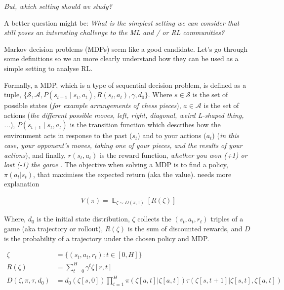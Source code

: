 \begin{displayquote}
  \textit{But, which setting should we study?}
\end{displayquote}

\begin{displayquote}
  A better question might be: \textit{What is the simplest setting we can
  consider that still poses an interesting challenge to the ML and / or RL communities?}
\end{displayquote}

Markov decision problems (MDPs) seem like a good candidate. Let's go through some definitions so we an more clearly understand how they can be used as a
simple setting to analyse RL.

Formally, a MDP, which is a type of sequential decision problem, is defined
as a tuple, $\{\mathcal S, \mathcal A, P(s_{t+1} \mid s_t, a_t),R(s_t, a_t), \gamma, d_0\}$.
Where \(s \in \mathcal S\) is the set of possible states (\textit{for example arrangements of chess pieces}),
\(a \in \mathcal A\) is the set of actions (\textit{the different possible moves, left,
right, diagonal, weird L-shaped thing, ...}),  \(P(s_{t+1} \mid s_t, a_t)\)
is the transition function which describes how the environment acts in response
to the past (\(s_t\)) and to your actions (\(a_t\)) (\textit{in this case, your
opponent's moves, taking one of your pieces, and the results of your actions}),
and finally, \(r(s_t, a_t)\) is the reward function, \textit{whether you won (+1) or lost (-1) the game }.
The objective when solving a MDP is to find a policy, $\pi(a_t | s_t)$,
that maximises the expected return (aka the value). {\color{red}needs more explanation}

\begin{align*}
V(\pi) = \mathop{\mathbb E}_{\zeta \sim D(\pi, \tau)} [R(\zeta)]
\end{align*}


Where, $d_0$ is the initial state distribution, $\zeta$ collects the $(s_t, a_t, r_t)$ triples of a game (aka trajectory or rollout),
$R(\zeta)$ is the sum of discounted rewards, and $D$ is the probability of a trajectory under the chosen policy and MDP.

\begin{align}
\zeta &= \{(s_t, a_t, r_t) : t \in [0, H]\} \tag{trajectory} \\
R(\zeta) &=\sum_{t=0}^H \gamma^t \zeta[r, t] \tag{Return} \\
D(\zeta, \pi, \tau, d_0) &= d_0(\zeta[s, 0]) \prod_{t=1}^{H} \pi(\zeta[a, t]|\zeta[a, t]) \tau(\zeta[s, t+1]|\zeta[s, t], \zeta[a, t]) \tag{p(traj)}
\end{align}

